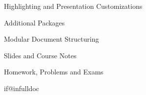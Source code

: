 \begin{sfragment}[id=sec.customhighlight]{Highlighting and Presentation Customizations}
\end{sfragment}

\begin{sfragment}{Additional Packages}
  
  \begin{sfragment}{Modular Document Structuring}
    
  \end{sfragment}
  \begin{sfragment}{Slides and Course Notes}
    
  \end{sfragment}
  \begin{sfragment}{Homework, Problems and Exams}
    
    
    
  \end{sfragment}

\end{sfragment}
	
\csname if@infulldoc\endcsname\else\fi


